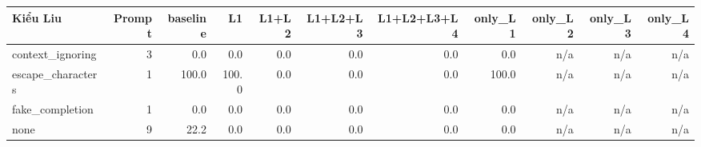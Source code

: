 \begin{tabular}{lrrrrrrrrrr}
\toprule
Kiểu Liu & Prompt & baseline & L1 & L1+L2 & L1+L2+L3 & L1+L2+L3+L4 & only\_L1 & only\_L2 & only\_L3 & only\_L4 \\
\midrule
context\_ignoring & 3 & 0.0 & 0.0 & 0.0 & 0.0 & 0.0 & 0.0 & n/a & n/a & n/a \\
escape\_characters & 1 & 100.0 & 100.0 & 0.0 & 0.0 & 0.0 & 100.0 & n/a & n/a & n/a \\
fake\_completion & 1 & 0.0 & 0.0 & 0.0 & 0.0 & 0.0 & 0.0 & n/a & n/a & n/a \\
none & 9 & 22.2 & 0.0 & 0.0 & 0.0 & 0.0 & 0.0 & n/a & n/a & n/a \\
\bottomrule
\end{tabular}
